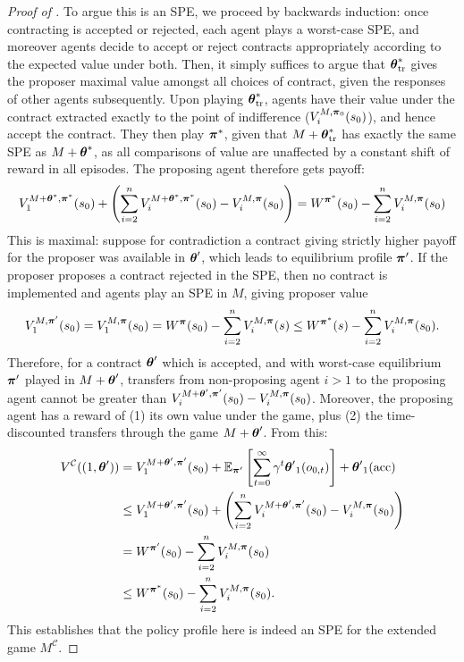 \begin{proof}[Proof of ]
To argue this is an SPE, we proceed by backwards induction: once contracting is accepted or rejected, each agent plays a worst-case SPE, and moreover agents decide to accept or reject contracts appropriately according to the expected value under both. Then, it simply suffices to argue that ${\boldsymbol{\theta}}^*_{\text{tr}}$ gives the proposer maximal value amongst all choices of contract, given the responses of other agents subsequently. Upon playing ${\boldsymbol{\theta}}^*_{\text{tr}}$, agents have their value under the contract extracted exactly to the point of indifference ($V_i^{M, \boldsymbol{\pi}_0}(s_0)$), and hence accept the contract. They then play $\boldsymbol{\pi}^*$, given that $M+{\boldsymbol{\theta}}^*_{\text{tr}}$ has exactly the same SPE as $M+{\boldsymbol{\theta}}^*$, as all comparisons of value are unaffected by a constant shift of reward in all episodes. The proposing agent therefore gets payoff:
\begin{multline*}
    V_1^{M+\boldsymbol{\theta}^*, \boldsymbol{\pi}^*}(s_0) + \left(\sum_{i=2}^n V_i^{M+\boldsymbol{\theta}^*, \boldsymbol{\pi}^*}(s_0) - V_i^{M, \boldsymbol{\pi}}(s_0)\right)
    = W^{\boldsymbol{\pi}^*}(s_0) - \sum_{i=2}^n V_i^{M, \boldsymbol{\pi}}(s_0)
\end{multline*}
This is maximal: suppose for contradiction a contract giving strictly higher payoff for the proposer was available in ${\boldsymbol{\theta}'}$, which leads to equilibrium profile $\boldsymbol{\pi}'$. If the proposer proposes a contract rejected in the SPE, then no contract is implemented and agents play an SPE in $M$, giving proposer value
\[
V_1^{M, \boldsymbol{\pi}'}(s_0) = V_1^{M, \boldsymbol{\pi}}(s_0) =  W^{\boldsymbol{\pi}}(s_0) - \sum_{i=2}^n V_i^{M, \boldsymbol{\pi}}(s) \le W^{\boldsymbol{\pi}^*}(s) - \sum_{i=2}^n V_i^{M, \boldsymbol{\pi}}(s_0).
\]
Therefore, for a contract ${\boldsymbol{\theta}'}$ which is accepted, and with worst-case equilibrium $\boldsymbol{\pi}'$ played in $M+{\boldsymbol{\theta}'}$, transfers from non-proposing agent $i>1$ to the proposing agent cannot be greater than $V_i^{M+{\boldsymbol{\theta}'}, \boldsymbol{\pi}'}(s_0) - V_i^{M, \boldsymbol{\pi}}(s_0)$. Moreover, the proposing agent has a reward of (1) its own value under the game, plus (2) the time-discounted transfers through the game $M+{\boldsymbol{\theta}'}$. From this:
\begin{align*}
    V^{\mathcal{C}}((1, {\boldsymbol{\theta}'})) &= V_1^{M+{\boldsymbol{\theta}'}, \boldsymbol{\pi}'}(s_0) + \mathbb{E}_{\boldsymbol{\pi}'}\left[\sum_{t=0}^\infty \gamma^t{\boldsymbol{\theta}'}_1(o_{0,t})\right] + {\boldsymbol{\theta}'}_1(\textrm{acc}) \\
    &\le V_1^{M+\boldsymbol{\theta}', \boldsymbol{\pi}'}(s_0) + \left(\sum_{i=2}^n V_i^{M+\boldsymbol{\theta}', \boldsymbol{\pi}'}(s_0) - V_i^{M, \boldsymbol{\pi}}(s_0)\right)  \\
    &= W^{\boldsymbol{\pi}'}(s_0) - \sum_{i=2}^n V_i^{M, \boldsymbol{\pi}}(s_0) \\
    &\le W^{\boldsymbol{\pi}^*}(s_0) - \sum_{i=2}^n V_i^{M, \boldsymbol{\pi}}(s_0).
\end{align*}
This establishes that the policy profile here is indeed an SPE for the extended game $M^{\mathcal{C}}$. 


\end{proof}
